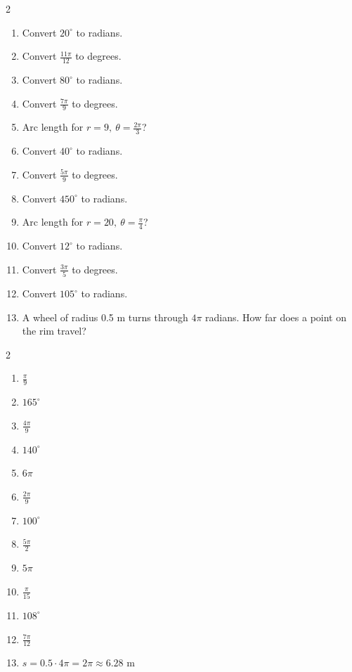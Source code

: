 \documentclass[11pt]{article}
\begin{document}
\begin{recapbox}
\begin{multicols}{2}
\small
\begin{enumerate}[leftmargin=*,itemsep=3pt]
  \item Convert $20^\circ$ to radians.
  \item Convert $\tfrac{11\pi}{12}$ to degrees.
  \item Convert $80^\circ$ to radians.
  \item Convert $\tfrac{7\pi}{9}$ to degrees.
  \item Arc length for $r=9,\ \theta=\tfrac{2\pi}{3}$?
  \item Convert $40^\circ$ to radians.
  \item Convert $\tfrac{5\pi}{9}$ to degrees.
  \item Convert $450^\circ$ to radians.
  \item Arc length for $r=20,\ \theta=\tfrac{\pi}{4}$?
  \item Convert $12^\circ$ to radians.
  \item Convert $\tfrac{3\pi}{5}$ to degrees.
  \item Convert $105^\circ$ to radians.
  \item A wheel of radius 0.5 m turns through $4\pi$ radians. How far does a point on the rim travel?
\end{enumerate}
\end{multicols}
\end{recapbox}

\begin{keybox}
\begin{multicols}{2}
\small
\begin{enumerate}[leftmargin=*,itemsep=3pt]
  \item $\tfrac{\pi}{9}$
  \item $165^\circ$
  \item $\tfrac{4\pi}{9}$
  \item $140^\circ$
  \item $6\pi$
  \item $\tfrac{2\pi}{9}$
  \item $100^\circ$
  \item $\tfrac{5\pi}{2}$
  \item $5\pi$
  \item $\tfrac{\pi}{15}$
  \item $108^\circ$
  \item $\tfrac{7\pi}{12}$
  \item $s=0.5\cdot4\pi=2\pi\approx6.28$ m
\end{enumerate}
\end{multicols}
\end{keybox}
\end{document}
